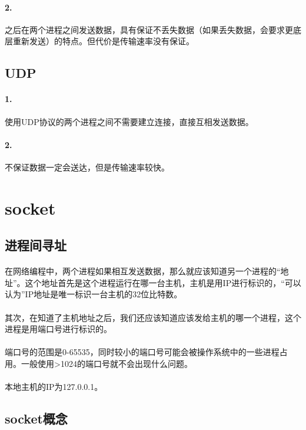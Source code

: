 \documentclass[12pt]{article}
\begin{document}
\begin{CJK}{UTF8}{gbsn}
\paragraph{2.}之后在两个进程之间发送数据，具有保证不丢失数据（如果丢失数据，会要求更底层重新发送）的特点。但代价是传输速率没有保证。

\subsection{UDP}
\paragraph{1.}使用UDP协议的两个进程之间不需要建立连接，直接互相发送数据。
\paragraph{2.}不保证数据一定会送达，但是传输速率较快。

\section{socket}
\subsection{进程间寻址}
\paragraph{}在网络编程中，两个进程如果相互发送数据，那么就应该知道另一个进程的“地址”。这个地址首先是这个进程运行在哪一台主机，主机是用IP进行标识的，“可以认为”IP地址是唯一标识一台主机的32位比特数。
\paragraph{}其次，在知道了主机地址之后，我们还应该知道应该发给主机的哪一个进程，这个进程是用端口号进行标识的。
\paragraph{}端口号的范围是0-65535，同时较小的端口号可能会被操作系统中的一些进程占用。一般使用>1024的端口号就不会出现什么问题。
\paragraph{}本地主机的IP为127.0.0.1。
\subsection{socket概念}

\end{CJK}
\end{document}
